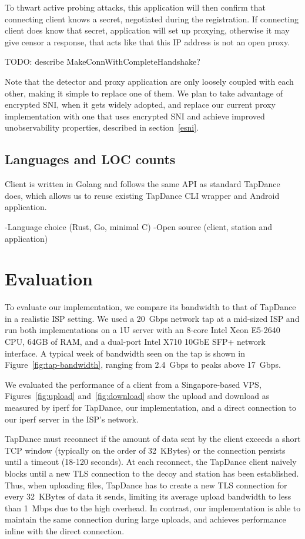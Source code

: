 \documentclass[sigconf]{acmart}
\newcommand{\TODO}[1]{\hl{TODO: #1}\xspace}
\begin{document}
To thwart active probing attacks, this application will then confirm
that connecting client knows a secret, negotiated during the registration.
If connecting client does know that secret, application will set up proxying,
otherwise it may give censor a response, that acts like that this IP address
is not an open proxy.

TODO: describe MakeConnWithCompleteHandshake?

Note that the detector and proxy application are only loosely coupled with each other,
making it simple to replace one of them.
We plan to take advantage of encrypted SNI, when it gets widely adopted,
and replace our current proxy implementation with one that uses encrypted SNI
and achieve improved unobservability properties, described in section~\ref{esni}.

\subsection{Languages and LOC counts} %
Client is written in Golang and follows the same API as standard TapDance does,
which allows us to reuse existing TapDance CLI wrapper and Android application.

-Language choice (Rust, Go, minimal C)
-Open source (client, station and application)
\fi


\section{Evaluation}
\label{sec:evaluation}


To evaluate our \scheme implementation, we compare its bandwidth
to that of TapDance in a realistic ISP setting. We used a 20~Gbps
network tap at a mid-sized ISP and run both implementations on a 1U server with
an 8-core Intel Xeon E5-2640 CPU, 64GB of RAM, and a dual-port Intel X710 10GbE SFP+
network interface. A typical week of bandwidth seen on the tap is
shown in Figure~\ref{fig:tap-bandwidth}, ranging from 2.4~Gbps to peaks above
17~Gbps.


We evaluated the performance of a client from a Singapore-based VPS,
Figures~\ref{fig:upload} and~\ref{fig:download} show the upload and download as
measured by iperf for TapDance, our \scheme implementation, and a direct
connection to our iperf server in the ISP's network.

TapDance must reconnect if the amount of data sent by the client
exceeds a short TCP window (typically on the order of 32~KBytes) or the
connection persists until a timeout (18-120 seconds). At each reconnect, the
TapDance client naively blocks until a new TLS connection to the decoy and
station has been established. Thus, when uploading files, TapDance has to create
a new TLS connection for every 32~KBytes of data it sends, limiting its average
upload bandwidth to less than 1~Mbps due to the high overhead. In contrast,
our \scheme implementation is
able to maintain the same connection during large uploads, and achieves
performance inline with the direct connection.
\end{document}
